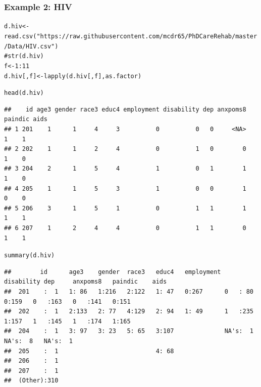 \documentclass[extsize,handout,10pt]{beamer}\usepackage[]{graphicx}\usepackage[]{color}
\makeatletter
\newcommand{\hlnum}[1]{\textcolor[rgb]{0.502,0.086,1}{#1}}%
\newcommand{\hlstr}[1]{\textcolor[rgb]{1,0.4,0.2}{#1}}%
\newcommand{\hlcom}[1]{\textcolor[rgb]{1,0.251,0.502}{#1}}%
\newcommand{\hlopt}[1]{\textcolor[rgb]{0.251,0.251,0.251}{#1}}%
\newcommand{\hlstd}[1]{\textcolor[rgb]{0.251,0.251,0.251}{#1}}%
\newcommand{\hlkwb}[1]{\textcolor[rgb]{0,0.439,0.902}{#1}}%
\newcommand{\hlkwd}[1]{\textcolor[rgb]{0.69,0.188,0.941}{#1}}%
\newenvironment{kframe}{%
 \def\at@end@of@kframe{}%
 \ifinner\ifhmode%
  \def\at@end@of@kframe{\end{minipage}}%
  \begin{minipage}{\columnwidth}%
 \fi\fi%
 \def\FrameCommand##1{\hskip\@totalleftmargin \hskip-\fboxsep
 \colorbox{shadecolor}{##1}\hskip-\fboxsep
     \hskip-\linewidth \hskip-\@totalleftmargin \hskip\columnwidth}%
 \MakeFramed {\advance\hsize-\width
   \@totalleftmargin\z@ \linewidth\hsize
   \@setminipage}}%
 {\par\unskip\endMakeFramed%
 \at@end@of@kframe}
\newenvironment{knitrout}{}{} %
\makeatother
\begin{document}
\begin{frame}[fragile]
  \frametitle{Example 2: HIV} 
\begin{knitrout}\tiny
{}\color{fgcolor}\begin{kframe}
\begin{alltt}
\hlstd{d.hiv}\hlkwb{<-}\hlkwd{read.csv}\hlstd{(}\hlstr{"https://raw.githubusercontent.com/mcdr65/PhDCareRehab/master/Data/HIV.csv"}\hlstd{)}
\hlcom{#str(d.hiv)}
\hlstd{f}\hlkwb{<-}\hlnum{1}\hlopt{:}\hlnum{11}
\hlstd{d.hiv[,f]}\hlkwb{<-}\hlkwd{lapply}\hlstd{(d.hiv[,f],as.factor)}
\end{alltt}
\end{kframe}
\end{knitrout}

\begin{knitrout}\tiny
{}\color{fgcolor}\begin{kframe}
\begin{alltt}
\hlkwd{head}\hlstd{(d.hiv)}
\end{alltt}
\begin{verbatim}
##    id age3 gender race3 educ4 employment disability dep anxpoms8 paindic aids
## 1 201    1      1     4     3          0          0   0     <NA>       1    1
## 2 202    1      1     2     4          0          1   0        0       1    0
## 3 204    2      1     5     4          1          0   1        1       1    0
## 4 205    1      1     5     3          1          0   0        1       0    0
## 5 206    3      1     5     1          0          1   1        1       1    1
## 6 207    1      2     4     4          0          1   1        0       1    1
\end{verbatim}
\begin{alltt}
\hlkwd{summary}\hlstd{(d.hiv)}
\end{alltt}
\begin{verbatim}
##        id      age3    gender  race3   educ4   employment disability dep     anxpoms8   paindic    aids   
##  201    :  1   1: 86   1:216   2:122   1: 47   0:267      0   : 80   0:159   0   :163   0   :141   0:151  
##  202    :  1   2:133   2: 77   4:129   2: 94   1: 49      1   :235   1:157   1   :145   1   :174   1:165  
##  204    :  1   3: 97   3: 23   5: 65   3:107              NA's:  1           NA's:  8   NA's:  1          
##  205    :  1                           4: 68                                                              
##  206    :  1                                                                                              
##  207    :  1                                                                                              
##  (Other):310
\end{verbatim}
\end{kframe}
\end{knitrout}
 

\end{frame}
\end{document}
